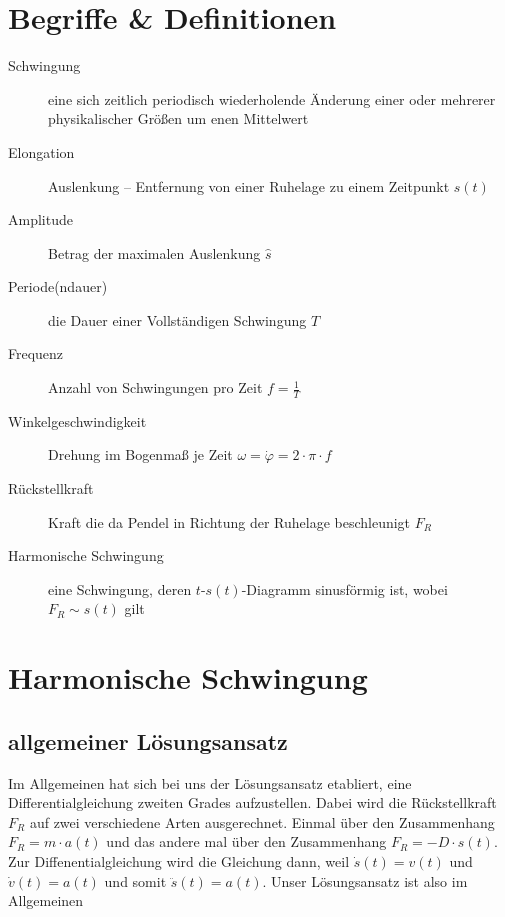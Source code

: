 		\chapter{Begriffe \& Definitionen}

\begin{description}
	\item[Schwingung] eine sich zeitlich periodisch wiederholende Änderung einer oder mehrerer physikalischer Größen um enen Mittelwert
	\item[Elongation] Auslenkung -- Entfernung von einer Ruhelage zu einem Zeitpunkt \(s(t)\)
	\item[Amplitude] Betrag der maximalen Auslenkung \(\hat{s}\)
	\item[Periode(ndauer)] die Dauer einer Vollständigen Schwingung \(T\)
	\item[Frequenz] Anzahl von Schwingungen pro Zeit \(f = \frac{1}{T}\)
	\item[Winkelgeschwindigkeit] Drehung im Bogenmaß je Zeit \(\omega = \dot{\varphi} = 2 \cdot \pi \cdot f\)
	\item[Rückstellkraft] Kraft die da Pendel in Richtung der Ruhelage beschleunigt \(F_R\)
	\item[Harmonische Schwingung] eine Schwingung, deren \(t\)-\(s(t)\)-Diagramm sinusförmig ist, wobei \(F_R \sim s(t)\) gilt 
\end{description}


				\chapter{Harmonische Schwingung}

		\section{allgemeiner Lösungsansatz}

Im Allgemeinen hat sich bei uns der Lösungsansatz etabliert, eine Differentialgleichung zweiten Grades aufzustellen. Dabei wird die Rückstellkraft \(F_R\) auf zwei verschiedene Arten ausgerechnet. Einmal über den Zusammenhang \(F_R = m \cdot a(t)\) und das andere mal über den Zusammenhang \(F_R = - D \cdot s(t)\). Zur Diffenentialgleichung wird die Gleichung dann, weil \(\dot{s}(t) = v(t)\) und \(\dot{v}(t) = a(t)\) und somit \(\ddot{s}(t) = a(t)\). Unser Lösungsansatz ist also im Allgemeinen

